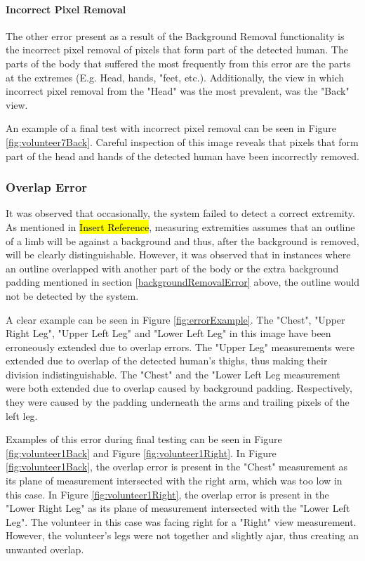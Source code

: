 \paragraph{Incorrect Pixel Removal}
The other error present as a result of the Background Removal functionality is the incorrect pixel removal of pixels that form part of the detected human. The parts of the body that suffered the most frequently from this error are the parts at the extremes (E.g. Head, hands, "feet, etc.). Additionally, the view in which incorrect pixel removal from the "Head" was the most prevalent, was the "Back" view. 

An example of a final test with incorrect pixel removal can be seen in Figure \ref{fig:volunteer7Back}. Careful inspection of this image reveals that pixels that form part of the head and hands of the detected human have been incorrectly removed. 

\subsubsection{Overlap Error}
It was observed that occasionally, the system failed to detect a correct extremity. As mentioned in \hl{Insert Reference}, measuring extremities assumes that an outline of a limb will be against a background and thus, after the background is removed, will be clearly distinguishable. However, it was observed that in instances where an outline overlapped with another part of the body or the extra background padding mentioned in section \ref{backgroundRemovalError} above, the outline would not be detected by the system. 

A clear example can be seen in Figure \ref{fig:errorExample}. The "Chest", "Upper Right Leg", "Upper Left Leg" and "Lower Left Leg" in this image have been erroneously extended due to overlap errors. The "Upper Leg" measurements were extended due to overlap of the detected human's thighs, thus making their division indistinguishable. The "Chest" and the "Lower Left Leg measurement were both extended due to overlap caused by background padding. Respectively, they were caused by the padding underneath the arms and trailing pixels of the left leg. 

Examples of this error during final testing can be seen in Figure \ref{fig:volunteer1Back} and Figure \ref{fig:volunteer1Right}. In Figure \ref{fig:volunteer1Back}, the overlap error is present in the "Chest" measurement as its plane of measurement intersected with the right arm, which was too low in this case. In Figure \ref{fig:volunteer1Right}, the overlap error is present in the "Lower Right Leg" as its plane of measurement intersected with the "Lower Left Leg". The volunteer in this case was facing right for a "Right" view measurement. However, the volunteer's legs were not together and slightly ajar, thus creating an unwanted overlap.

